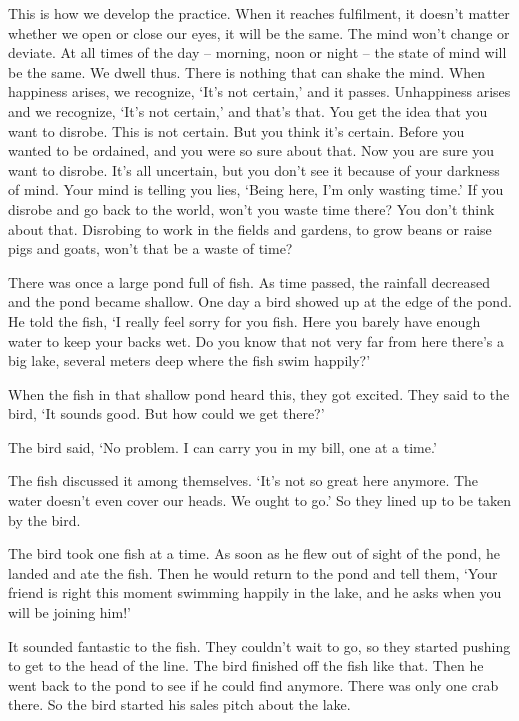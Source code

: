 This is how we develop the practice. When it reaches fulfilment, it doesn't matter whether we open or close our eyes, it will be the same. The mind won't change or deviate. At all times of the day -- morning, noon or night -- the state of mind will be the same. We dwell thus. There is nothing that can shake the mind. When happiness arises, we recognize, `It's not certain,' and it passes. Unhappiness arises and we recognize, `It's not certain,' and that's that. You get the idea that you want to disrobe. This is not certain. But you think it's certain. Before you wanted to be ordained, and you were so sure about that. Now you are sure you want to disrobe. It's all uncertain, but you don't see it because of your darkness of mind. Your mind is telling you lies, `Being here, I'm only wasting time.' If you disrobe and go back to the world, won't you waste time there? You don't think about that. Disrobing to work in the fields and gardens, to grow beans or raise pigs and goats, won't that be a waste of time? 

There was once a large pond full of fish. As time passed, the rainfall decreased and the pond became shallow. One day a bird showed up at the edge of the pond. He told the fish, `I really feel sorry for you fish. Here you barely have enough water to keep your backs wet. Do you know that not very far from here there's a big lake, several meters deep where the fish swim happily?' 

When the fish in that shallow pond heard this, they got excited. They said to the bird, `It sounds good. But how could we get there?' 

The bird said, `No problem. I can carry you in my bill, one at a time.' 

The fish discussed it among themselves. `It's not so great here anymore. The water doesn't even cover our heads. We ought to go.' So they lined up to be taken by the bird. 

The bird took one fish at a time. As soon as he flew out of sight of the pond, he landed and ate the fish. Then he would return to the pond and tell them, `Your friend is right this moment swimming happily in the lake, and he asks when you will be joining him!' 

It sounded fantastic to the fish. They couldn't wait to go, so they started pushing to get to the head of the line. The bird finished off the fish like that. Then he went back to the pond to see if he could find anymore. There was only one crab there. So the bird started his sales pitch about the lake. 

